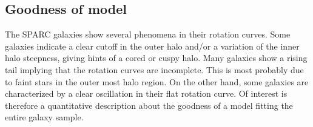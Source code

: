 \subsection{Goodness of model}
\label{sec:result:gof}
The SPARC galaxies show several phenomena in their rotation curves. Some galaxies indicate a clear cutoff in the outer halo and/or a variation of the inner halo steepness, giving hints of a cored or cuspy halo. Many galaxies show a rising tail implying that the rotation curves are incomplete. This is most probably due to faint stars in the outer most halo region. On the other hand, some galaxies are characterized by a clear oscillation in their flat rotation curve. Of interest is therefore a quantitative description about the goodness of a model fitting the entire galaxy sample.


